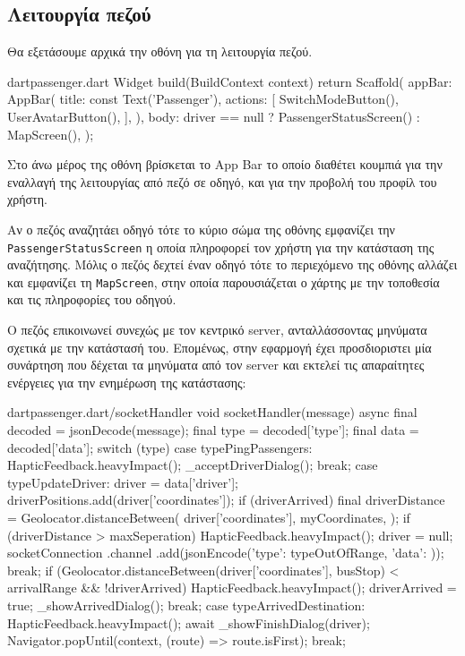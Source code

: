 \documentclass[../thesis.tex]{subfiles}
\begin{document}
\subsection{Λειτουργία πεζού}

Θα εξετάσουμε αρχικά την οθόνη για τη λειτουργία πεζού.

\begin{codeblock}{dart}{passenger.dart}
  Widget build(BuildContext context) {
    return Scaffold(
      appBar: AppBar(
        title: const Text('Passenger'),
        actions: [
          SwitchModeButton(),
          UserAvatarButton(),
        ],
      ),
      body: driver == null
          ? PassengerStatusScreen()
          : MapScreen(),
    );
  }
\end{codeblock}

Στο άνω μέρος της οθόνη βρίσκεται το App Bar το οποίο διαθέτει κουμπιά για την εναλλαγή της λειτουργίας από πεζό σε οδηγό, και για την προβολή του προφίλ του χρήστη.

Αν ο πεζός αναζητάει οδηγό τότε το κύριο σώμα της οθόνης εμφανίζει την \texttt{Passenger\-Status\-Screen} η οποία πληροφορεί τον χρήστη για την κατάσταση της αναζήτησης.
Μόλις ο πεζός δεχτεί έναν οδηγό τότε το περιεχόμενο της οθόνης αλλάζει και εμφανίζει τη \texttt{MapScreen}, στην οποία παρουσιάζεται ο χάρτης με την τοποθεσία και τις πληροφορίες του οδηγού.

\bigskip

Ο πεζός επικοινωνεί συνεχώς με τον κεντρικό server, ανταλλάσσοντας μηνύματα σχετικά με την κατάστασή του.
Επομένως, στην εφαρμογή έχει προσδιοριστει μία συνάρτηση που δέχεται τα μηνύματα από τον server και εκτελεί τις απαραίτητες ενέργειες για την ενημέρωση της κατάστασης:

\begin{codeblock}{dart}{passenger.dart/socketHandler}
  void socketHandler(message) async {
    final decoded = jsonDecode(message);
    final type = decoded['type'];
    final data = decoded['data'];
    switch (type) {
      case typePingPassengers:
        HapticFeedback.heavyImpact();
        _acceptDriverDialog();
        break;
      case typeUpdateDriver:
        driver = data['driver'];
        driverPositions.add(driver['coordinates']);
        if (driverArrived) {
          final driverDistance = Geolocator.distanceBetween(
            driver['coordinates'],
            myCoordinates,
          );
          if (driverDistance > maxSeperation) {
            HapticFeedback.heavyImpact();
            driver = null;
            socketConnection
              .channel
              .add(jsonEncode({'type': typeOutOfRange, 'data': {}}));
            break;
          }
        }
        if (Geolocator.distanceBetween(driver['coordinates'], busStop) < 
        arrivalRange && !driverArrived) {
          HapticFeedback.heavyImpact();
          driverArrived = true;
          _showArrivedDialog();
        }
        break;
      case typeArrivedDestination:
        HapticFeedback.heavyImpact();
        await _showFinishDialog(driver);
        Navigator.popUntil(context, (route) => route.isFirst);
        break;
    }
  }
\end{codeblock}
\end{document}
